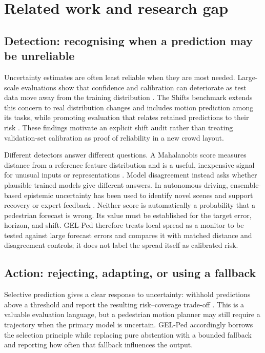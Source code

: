 \section{Related work and research gap}
\label{sec:related_referee3}

\subsection{Detection: recognising when a prediction may be unreliable}

Uncertainty estimates are often least reliable when they are most needed. Large-scale evaluations show that confidence and calibration can deteriorate as test data move away from the training distribution \citep{ovadia2019uncertainty}. The Shifts benchmark extends this concern to real distribution changes and includes motion prediction among its tasks, while promoting evaluation that relates retained predictions to their risk \citep{malinin2021shifts}. These findings motivate an explicit shift audit rather than treating validation-set calibration as proof of reliability in a new crowd layout.

Different detectors answer different questions. A Mahalanobis score measures distance from a reference feature distribution and is a useful, inexpensive signal for unusual inputs or representations \citep{lee2018mahalanobis}. Model disagreement instead asks whether plausible trained models give different answers. In autonomous driving, ensemble-based epistemic uncertainty has been used to identify novel scenes and support recovery or expert feedback \citep{filos2020distribution}. Neither score is automatically a probability that a pedestrian forecast is wrong. Its value must be established for the target error, horizon, and shift. GEL-Ped therefore treats local spread as a monitor to be tested against large forecast errors and compares it with matched distance and disagreement controls; it does not label the spread itself as calibrated risk.

\subsection{Action: rejecting, adapting, or using a fallback}

Selective prediction gives a clear response to uncertainty: withhold predictions above a threshold and report the resulting risk--coverage trade-off \citep{geifman2017selective,cortes2016rejection}. This is a valuable evaluation language, but a pedestrian motion planner may still require a trajectory when the primary model is uncertain. GEL-Ped accordingly borrows the selection principle while replacing pure abstention with a bounded fallback and reporting how often that fallback influences the output.

